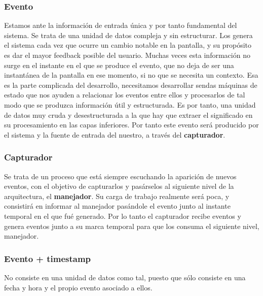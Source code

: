 \documentclass[12pt,a4paper,oneside]{book} %
\begin{document}
\subsubsection{Evento}
Estamos ante la información de entrada única y por tanto fundamental del sistema. Se trata de una unidad de datos compleja y sin estructurar. 
\newline
\newline
Los genera el sistema cada vez que ocurre un cambio notable en la pantalla, y su propósito es dar el mayor feedback posible del usuario. 
\newline
\newline
Muchas veces esta información no surge en el instante en el que se produce el evento, que no deja de ser una instantánea de la pantalla en ese momento, si no que se necesita un contexto. Esa es la parte complicada del desarrollo, necesitamos desarrollar sendas máquinas de estado 	que nos ayuden a relacionar los eventos entre ellos y procesarlos de tal modo que se produzca información útil y estructurada. 
\newline
\newline
Es por tanto, una unidad de datos muy cruda y desestructurada a la que hay que extraer el significado en su procesamiento en las capas inferiores. Por tanto este evento será producido por el sistema y la fuente de entrada del nuestro, a través del \textbf{capturador}.
\subsubsection{Capturador}
Se trata de un proceso que está siempre escuchando la aparición de nuevos eventos, con el objetivo de capturarlos y pasárselos al siguiente nivel de la arquitectura, el \textbf{manejador}. Su carga de trabajo realmente será poca, y consistirá en informar al manejador pasándole el evento junto al instante temporal en el que fué generado. 
\newline
\newline
Por lo tanto el capturador recibe eventos y genera eventos junto a su marca temporal para que los consuma el siguiente nivel, manejador. 
\subsubsection{Evento + timestamp}
No consiste en una unidad de datos como tal, puesto que sólo consiste en una fecha y hora y el propio evento asociado a ellos. 
\end{document}
